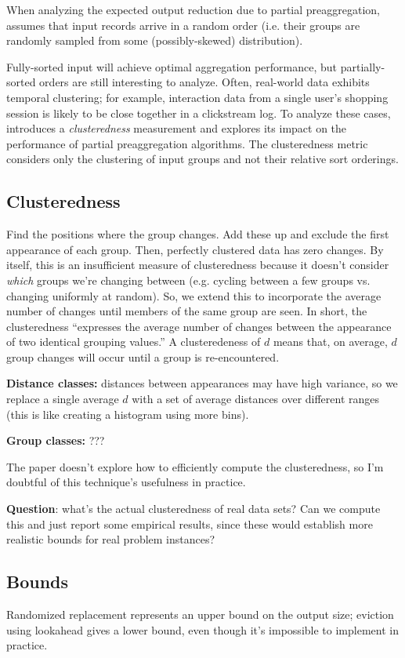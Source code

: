 \documentclass[12pt]{article}
\begin{document}
When analyzing the expected output reduction due to partial preaggregation, \cite{partial-preaggregation} assumes that input records arrive in a random order (i.e. their groups are randomly sampled from some (possibly-skewed) distribution).

Fully-sorted input will achieve optimal aggregation performance, but partially-sorted orders are still interesting to analyze.  Often, real-world data exhibits temporal clustering; for example, interaction data from a single user's shopping session is likely to be close together in a clickstream log.  To analyze these cases, \cite{estimating-cardinality} introduces a \emph{clusteredness} measurement and explores its impact on the performance of partial preaggregation algorithms.  The clusteredness metric considers only the clustering of input groups and not their relative sort orderings.

\subsection{Clusteredness}

Find the positions where the group changes.  Add these up and exclude the first appearance of each group.  Then, perfectly clustered data has zero changes.  By itself, this is an insufficient measure of clusteredness because it doesn't consider \emph{which} groups we're changing between (e.g. cycling between a few groups vs. changing uniformly at random).  So, we extend this to incorporate the average number of changes until members of the same group are seen.  In short, the clusteredness ``expresses the average number of changes between the appearance of two identical grouping values.''  A clusteredeness of $d$ means that, on average, $d$ group changes will occur until a group is re-encountered.


\textbf{Distance classes:} distances between appearances may have high variance, so we replace a single average $d$ with a set of average distances over different ranges (this is like creating a histogram using more bins).

\textbf{Group classes:} ???

The paper doesn't explore how to efficiently compute the clusteredness, so I'm doubtful of this technique's usefulness in practice.

\textbf{Question}: what's the actual clusteredness of real data sets?  Can we compute this and just report some empirical results, since these would establish more realistic bounds for real problem instances?

\subsection{Bounds}

\cite{estimating-cardinality}
Randomized replacement represents an upper bound on the output size; eviction using lookahead gives a lower bound, even though it's impossible to implement in practice.




\end{document}
